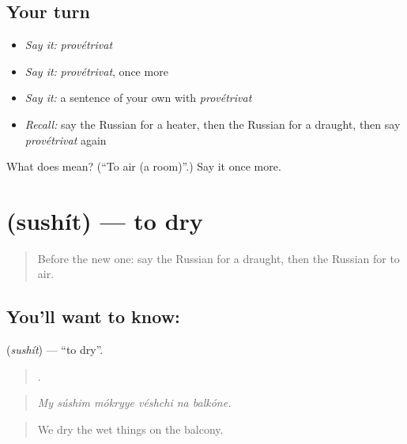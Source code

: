 \subsection*{Your turn}
\begin{itemize}
\raggedright
  \item \emph{Say it:} \emph{provétrivat}
  \item \emph{Say it:} \emph{provétrivat}, once more
  \item \emph{Say it:} a sentence of your own with \emph{provétrivat}
  \item \emph{Recall:} say the Russian for a heater, then the Russian for a draught, then say \emph{provétrivat} again
\end{itemize}

\begin{tcolorbox}[breakable,colback=teal!4,colframe=teal!35!black,title={Before you move on}]
What does  mean? (\textquotedblleft{}To air (a room)\textquotedblright{}.) Say it once more.
\end{tcolorbox}
\section[\texorpdfstring{\ru{сушить} (sushít)}{сушить (sushít)}]{ (sushít) — to dry}

\label{lesson:RU-C431-sushit}



\begin{quote}
Before the new one: say the Russian for a draught, then the Russian for to air.
\end{quote}

\subsection*{You'll want to know: }
\textbf{} (\emph{sushít}) — \textquotedblleft{}to dry\textquotedblright{}.

\begin{quote}
     .
\end{quote}

\begin{quote}
\emph{My súshim mókryye véshchi na balkóne.}
\end{quote}

\begin{quote}
We dry the wet things on the balcony.
\end{quote}

